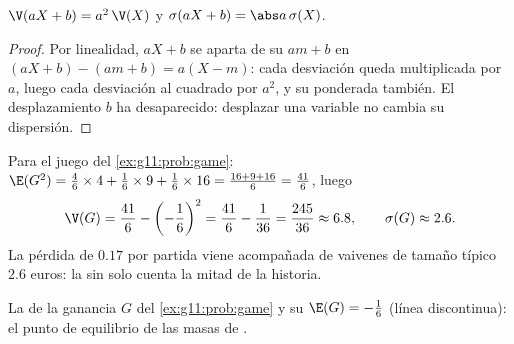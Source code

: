 \begin{proposition}\label{prop:g11:prob:affine}
$\V(aX + b) = a^2\,\V(X)$ y $\sigma(aX + b) = \abs a\,\sigma(X)$.
\end{proposition}

\begin{proof}
Por linealidad, $aX + b$ se aparta de su  $a m + b$ en
$(aX + b) - (am + b) = a(X - m)$: cada desviación queda multiplicada por
$a$, luego cada desviación al cuadrado por $a^2$, y su  ponderada
también. El desplazamiento $b$ ha desaparecido: desplazar una variable no
cambia su dispersión.
\end{proof}

\begin{example}\label{ex:g11:prob:variance}
Para el juego del \cref{ex:g11:prob:game}:
$\E(G^2) = \frac46 \times 4 + \frac16 \times 9 + \frac16 \times 16
= \frac{16 + 9 + 16}{6} = \frac{41}{6}$, luego
\[
\V(G) = \frac{41}{6} - \left(-\frac16\right)^2
= \frac{41}{6} - \frac{1}{36} = \frac{245}{36} \approx 6.8,
\qquad
\sigma(G) \approx 2.6 .
\]
La pérdida  de $0.17$ por partida viene acompañada de vaivenes de
tamaño típico $2.6$ euros: la  sin  solo cuenta
la mitad de la historia.
\end{example}

\begin{omfigure}

{\small La  de la ganancia $G$ del \cref{ex:g11:prob:game} y
su  $\E(G) = -\frac16$ (línea discontinua): el punto de
equilibrio de las masas de .}
\end{omfigure}

